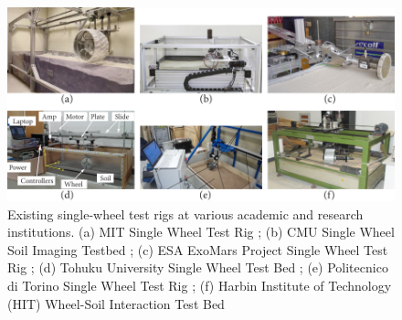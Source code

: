 \documentclass{article}
\begin{document}
\begin{figure}[hbt!]
\centering
\includegraphics[width=6.5in]{general-images/existing-test-rigs.pdf}
\caption{Existing single-wheel test rigs at various academic and research institutions. (a) MIT Single Wheel Test Rig \cite{senatore2014modeling}; (b) CMU Single Wheel Soil Imaging Testbed \cite{moreland2012soil}; (c) ESA ExoMars Project Single Wheel Test Rig \cite{gallina2014parameter}; (d) Tohuku University Single Wheel Test Bed \cite{ishigami2008terramechanics}; (e) Politecnico di Torino Single Wheel Test Rig \cite{genta2016testing}; (f) Harbin Institute of Technology (HIT) Wheel-Soil Interaction Test Bed \cite{ding2013experimental}}
\label{fig:existing-test-rigs}
\end{figure}
\end{document}
